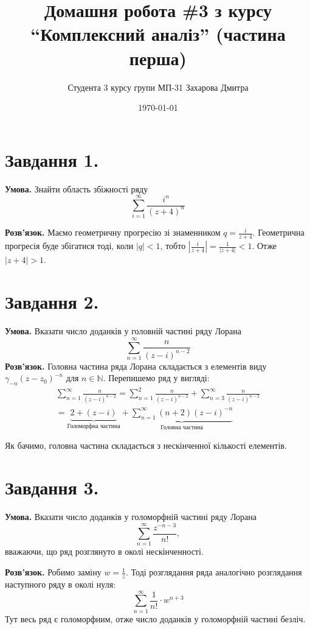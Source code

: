 \documentclass[14pt]{extarticle}
\title{Домашня робота \#3 з курсу ``Комплексний аналіз'' (частина перша)}
\author{Студента 3 курсу групи МП-31 Захарова Дмитра}
\date{\today}
\begin{document}
\maketitle

\section*{Завдання 1.} 

\textbf{Умова.} Знайти область збіжності ряду
\[
\sum_{i=1}^{\infty} \frac{i^n}{(z+4)^n}
\]

\textbf{Розв'язок.} Маємо геометричну прогресію зі знаменником $q=\frac{i}{z+4}$. Геометрична прогресія буде збігатися тоді, коли $|q|<1$, тобто $\left|\frac{i}{z+4}\right|=\frac{1}{|z+4|} < 1$. Отже $|z+4|>1$. 

\section*{Завдання 2.} 

\textbf{Умова.} Вказати число доданків у головній частині ряду Лорана 
\[
\sum_{n=1}^{\infty} \frac{n}{(z-i)^{n-2}}
\]
\textbf{Розв'язок.} Головна частина ряда Лорана складається з елементів виду $\gamma_{-n}(z-z_0)^{-n}$ для $n \in \mathbb{N}$. Перепишемо ряд у вигляді:
\begin{gather*}
\sum_{n=1}^{\infty} \frac{n}{(z-i)^{n-2}} = \sum_{n=1}^2 \frac{n}{(z-i)^{n-2}} + \sum_{n=3}^{\infty} \frac{n}{(z-i)^{n-2}}\\
= \underbrace{2 + (z-i)}_{\text{Голоморфна частина}} + \underbrace{\sum_{n=1}^{\infty} (n+2)(z-i)^{-n}}_{\text{Головна частина}}
\end{gather*}

Як бачимо, головна частина складається з нескінченної кількості елементів.

\section*{Завдання 3.} 

\textbf{Умова.} Вказати число доданків у голоморфній частині ряду Лорана 
\[
\sum_{n=1}^{\infty} \frac{z^{-n-3}}{n!},
\]
вважаючи, що ряд розглянуто в околі нескінченності. 

\textbf{Розв'язок.} Робимо заміну $w=\frac{1}{z}$. Тоді розглядання ряда аналогічно розглядання наступного ряду в околі нуля:
\[
\sum_{n=1}^{\infty}\frac{1}{n!} \cdot w^{n+3}
\]
Тут весь ряд є голоморфним, отже число доданків у голоморфній частині безліч. 
\end{document}
